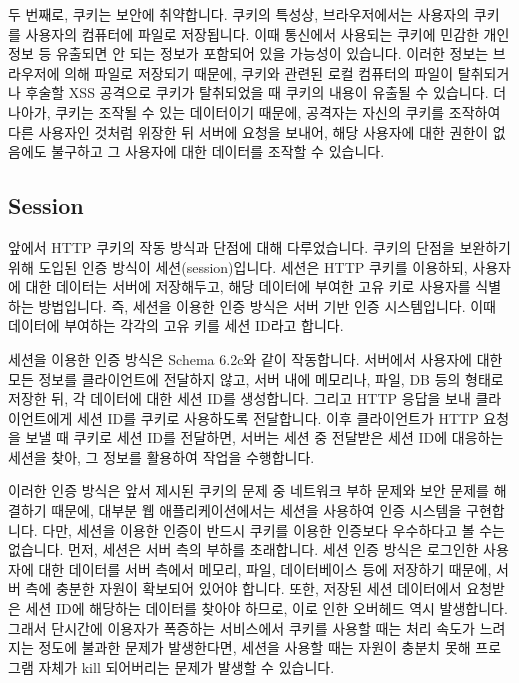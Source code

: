두 번째로, 쿠키는 보안에 취약합니다. 쿠키의 특성상, 브라우저에서는 사용자의 쿠키를 사용자의 컴퓨터에 파일로 저장됩니다. 이때 통신에서 사용되는 쿠키에 민감한 개인정보 등 유출되면 안 되는 정보가 포함되어 있을 가능성이 있습니다. 이러한 정보는 브라우저에 의해 파일로 저장되기 때문에, 쿠키와 관련된 로컬 컴퓨터의 파일이 탈취되거나 후술할 XSS 공격으로 쿠키가 탈취되었을 때 쿠키의 내용이 유출될 수 있습니다. 더 나아가, 쿠키는 조작될 수 있는 데이터이기 때문에, 공격자는 자신의 쿠키를 조작하여 다른 사용자인 것처럼 위장한 뒤 서버에 요청을 보내어, 해당 사용자에 대한 권한이 없음에도 불구하고 그 사용자에 대한 데이터를 조작할 수 있습니다.

\subsection*{Session}

앞에서 HTTP 쿠키의 작동 방식과 단점에 대해 다루었습니다. 쿠키의 단점을 보완하기 위해 도입된 인증 방식이 세션(session)입니다. 세션은 HTTP 쿠키를 이용하되, 사용자에 대한 데이터는 서버에 저장해두고, 해당 데이터에 부여한 고유 키로 사용자를 식별하는 방법입니다. 즉, 세션을 이용한 인증 방식은 서버 기반 인증 시스템입니다. 이때 데이터에 부여하는 각각의 고유 키를 세션 ID라고 합니다.

세션을 이용한 인증 방식은 Schema 6.2c와 같이 작동합니다. 서버에서 사용자에 대한 모든 정보를 클라이언트에 전달하지 않고, 서버 내에 메모리나, 파일, DB 등의 형태로 저장한 뒤, 각 데이터에 대한 세션 ID를 생성합니다. 그리고 HTTP 응답을 보내 클라이언트에게 세션 ID를 쿠키로 사용하도록 전달합니다. 이후 클라이언트가 HTTP 요청을 보낼 때 쿠키로 세션 ID를 전달하면, 서버는 세션 중 전달받은 세션 ID에 대응하는 세션을 찾아, 그 정보를 활용하여 작업을 수행합니다.

이러한 인증 방식은 앞서 제시된 쿠키의 문제 중 네트워크 부하 문제와 보안 문제를 해결하기 때문에, 대부분 웹 애플리케이션에서는 세션을 사용하여 인증 시스템을 구현합니다. 다만, 세션을 이용한 인증이 반드시 쿠키를 이용한 인증보다 우수하다고 볼 수는 없습니다.
먼저, 세션은 서버 측의 부하를 초래합니다. 세션 인증 방식은 로그인한 사용자에 대한 데이터를 서버 측에서 메모리, 파일, 데이터베이스 등에 저장하기 때문에, 서버 측에 충분한 자원이 확보되어 있어야 합니다. 또한, 저장된 세션 데이터에서 요청받은 세션 ID에 해당하는 데이터를 찾아야 하므로, 이로 인한 오버헤드 역시 발생합니다. 그래서 단시간에 이용자가 폭증하는 서비스에서 쿠키를 사용할 때는 처리 속도가 느려지는 정도에 불과한 문제가 발생한다면, 세션을 사용할 때는 자원이 충분치 못해 프로그램 자체가 kill 되어버리는 문제가 발생할 수 있습니다.

